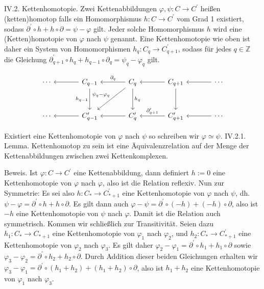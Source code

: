 \documentclass[10pt, letterpaper]{article}
\begin{document}
IV.2. Kettenhomotopie. Zwei Kettenabbildungen $\varphi, \psi: C \rightarrow C^{\prime}$ heißen (ketten)homotop falls ein Homomorphismus $h: C \rightarrow C^{\prime}$ vom Grad 1 existiert, sodass $\partial^{\prime} \circ h+h \circ \partial=\psi-\varphi$ gilt. Jeder solche Homomorphismus $h$ wird eine (Ketten)homotopie von $\varphi$ nach $\psi$ genannt. Eine Kettenhomotopie wie oben ist daher ein System von Homomorphismen $h_q: C_q \rightarrow C_{q+1}^{\prime}$, sodass für jedes $q \in \mathbb{Z}$ die Gleichung $\partial_{q+1}^{\prime} \circ h_q+h_{q-1} \circ \partial_q=\psi_q-\varphi_q$ gilt.

\[
\begin{tikzcd}[column sep=3.5em, row sep=3em]
\cdots & C_{q-1} \arrow[l] \arrow[d, "h_{q-1}"'] & C_q \arrow[l, "\partial_q"'] \arrow[d, "h_q"] \arrow[dl, "\psi_q - \varphi_q"'] & C_{q+1} \arrow[l] \arrow[d] & \cdots \arrow[l] \\
\cdots & C'_{q-1} \arrow[l] & C'_q \arrow[l] & C'_{q+1} \arrow[l, "\partial'_{q+1}"'] & \cdots \arrow[l]
\end{tikzcd}
\]


Existiert eine Kettenhomotopie von $\varphi$ nach $\psi$ so schreiben wir $\varphi \simeq \psi$.
IV.2.1. Lemma. Kettenhomotop zu sein ist eine Äquivalenzrelation auf der Menge der Kettenabbildungen zwischen zwei Kettenkomplexen.

Beweis. Ist $\varphi: C \rightarrow C^{\prime}$ eine Kettenabbildung, dann definiert $h:=0$ eine Kettenhomotopie von $\varphi$ nach $\varphi$, also ist die Relation reflexiv. Nun zur Symmetrie: Es sei also $h: C_* \rightarrow C_{*+1}^{\prime}$ eine Kettenhomotopie von $\varphi$ nach $\psi$, dh. $\psi-\varphi=\partial^{\prime} \circ h+h \circ \partial$. Es gilt dann auch $\varphi-\psi=\partial^{\prime} \circ(-h)+(-h) \circ \partial$, also ist $-h$ eine Kettenhomotopie von $\psi$ nach $\varphi$. Damit ist die Relation auch symmetrisch. Kommen wir schließlich zur Transitivität. Seien dazu $h_1: C_* \rightarrow C_{*+1}$ eine Kettenhomotopie von $\varphi_1$ nach $\varphi_2$, und $h_2: C_* \rightarrow C_{*+1}^{\prime}$ eine Kettenhomotopie von $\varphi_2$ nach $\varphi_3$. Es gilt daher $\varphi_2-\varphi_1=\partial^{\prime} \circ h_1+h_1 \circ \partial$ sowie $\varphi_3-\varphi_2=\partial^{\prime} \circ h_2+h_2 \circ \partial$. Durch Addition dieser beiden Gleichungen erhalten wir $\varphi_3-\varphi_1=\partial^{\prime} \circ\left(h_1+h_2\right)+\left(h_1+h_2\right) \circ \partial$, also ist $h_1+h_2$ eine Kettenhomotopie von $\varphi_1$ nach $\varphi_3$.
\end{document}

